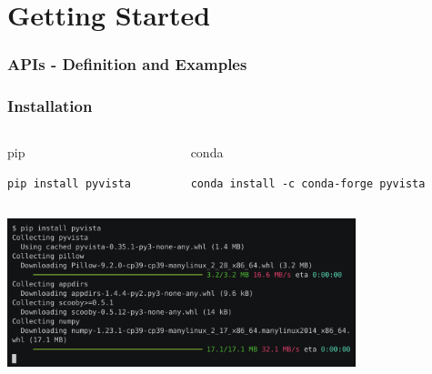 \documentclass[t]{beamer}
\begin{document}
\section{Getting Started}

\begin{frame}
  \frametitle{APIs - Definition and Examples}
  \tableofcontents[currentsection]
  \vspace{200pt}  %
\end{frame}

\begin{frame}[fragile=singleslide]
  \frametitle{Installation}
  \vspace{-10pt}

  \begin{columns}[T]
    \begin{column}{.5\textwidth}
      \vspace{-10pt}
      \begin{exampleblock}{pip}
        \begin{lstlisting}[basicstyle=\ttfamily\footnotesize]
pip install pyvista
        \end{lstlisting}
      \end{exampleblock}

    \end{column}

    \begin{column}{.5\textwidth}
      \vspace{-10pt}
      \begin{exampleblock}{conda}
        \begin{lstlisting}[basicstyle=\ttfamily\footnotesize]
conda install -c conda-forge pyvista
        \end{lstlisting}
      \end{exampleblock}

    \end{column}
  \end{columns}

  \vspace{5pt}

  \centering
  \href{https://asciinema.org/a/507562}{\includegraphics[width=0.76\textwidth]{figures/install_pyvista.png}}

\end{frame}

\lastframe{}
\end{document}
